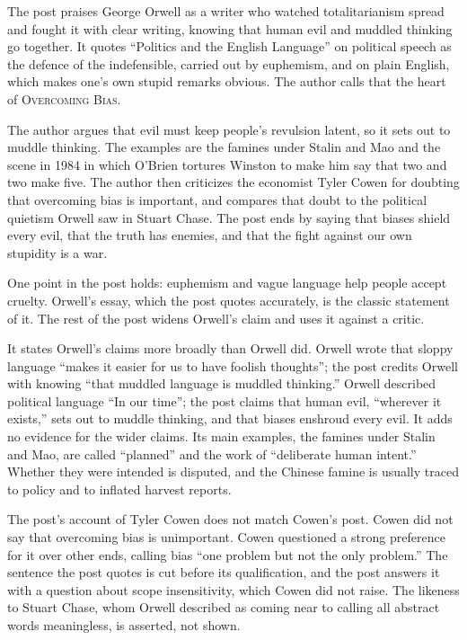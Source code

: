\begin{afterword}
\summaryhead

The post praises George Orwell as a writer who watched totalitarianism spread and fought it with clear writing, knowing that human evil and muddled thinking go together. It quotes ``Politics and the English Language'' on political speech as the defence of the indefensible, carried out by euphemism, and on plain English, which makes one's own stupid remarks obvious. The author calls that the heart of \textsc{Overcoming Bias}.

The author argues that evil must keep people's revulsion latent, so it sets out to muddle thinking. The examples are the famines under Stalin and Mao and the scene in \textsc{1984} in which O'Brien tortures Winston to make him say that two and two make five. The author then criticizes the economist Tyler Cowen for doubting that overcoming bias is important, and compares that doubt to the political quietism Orwell saw in Stuart Chase. The post ends by saying that biases shield every evil, that the truth has enemies, and that the fight against our own stupidity is a war.

\responsehead

One point in the post holds: euphemism and vague language help people accept cruelty. Orwell's essay, which the post quotes accurately, is the classic statement of it. The rest of the post widens Orwell's claim and uses it against a critic.

It states Orwell's claims more broadly than Orwell did. Orwell wrote that sloppy language ``makes it easier for us to have foolish thoughts''; the post credits Orwell with knowing ``that muddled language is muddled thinking.'' Orwell described political language ``In our time''; the post claims that human evil, ``wherever it exists,'' sets out to muddle thinking, and that biases enshroud every evil. It adds no evidence for the wider claims. Its main examples, the famines under Stalin and Mao, are called ``planned'' and the work of ``deliberate human intent.'' Whether they were intended is disputed, and the Chinese famine is usually traced to policy and to inflated harvest reports.

The post's account of Tyler Cowen does not match Cowen's post. Cowen did not say that overcoming bias is unimportant. Cowen questioned a strong preference for it over other ends, calling bias ``one problem but not the only problem.'' The sentence the post quotes is cut before its qualification, and the post answers it with a question about scope insensitivity, which Cowen did not raise. The likeness to Stuart Chase, whom Orwell described as coming near to calling all abstract words meaningless, is asserted, not shown.


\end{afterword}
